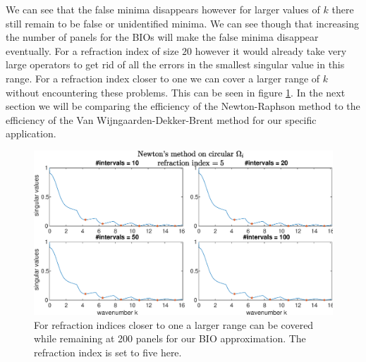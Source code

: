 \documentclass[a4paper, oneside]{thirdparty_stylesheets/discothesis}
\begin{document}
We can see that the false minima disappears however for larger values of $k$ there still remain to be false or unidentified minima.
We can see though that increasing the number of panels for the BIOs will make the false minima disappear eventually.
For a refraction index of size $20$ however it would already take very large operators to get rid of all the errors in the smallest singular value in this range.
For a refraction index closer to one we can cover a larger range of $k$ without encountering these problems.
This can be seen in figure \ref{fig:roots_newton_circle_200_5}.
In the next section we will be comparing the efficiency of the Newton-Raphson method to the efficiency of the Van Wijngaarden-Dekker-Brent method for our specific application.

\begin{figure} [H]
	\centering
	\includegraphics[width=\columnwidth]{figures/roots_newton_circle_200_5.eps}
	\caption{
		For refraction indices closer to one a larger range can be covered while remaining at 200 panels for our BIO approximation.
		The refraction index is set to five here.
	}
	\label{fig:roots_newton_circle_200_5}
\end{figure}
\end{document}
